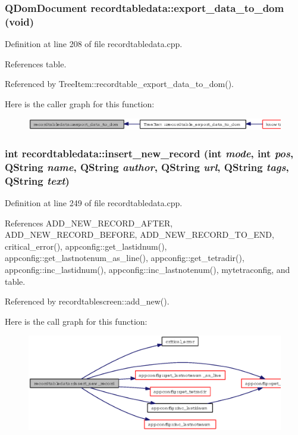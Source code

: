 \subsubsection{\setlength{\rightskip}{0pt plus 5cm}QDom\-Document recordtabledata::export\_\-data\_\-to\_\-dom (void)}\label{classrecordtabledata_fd04b0ca1500e0fd9ac3fb2d56c12b82}




Definition at line 208 of file recordtabledata.cpp.

References table.

Referenced by Tree\-Item::recordtable\_\-export\_\-data\_\-to\_\-dom().

Here is the caller graph for this function:\begin{figure}[H]
\begin{center}
\leavevmode
\includegraphics[width=371pt]{classrecordtabledata_fd04b0ca1500e0fd9ac3fb2d56c12b82_icgraph}
\end{center}
\end{figure}
\subsubsection{\setlength{\rightskip}{0pt plus 5cm}int recordtabledata::insert\_\-new\_\-record (int {\em mode}, int {\em pos}, QString {\em name}, QString {\em author}, QString {\em url}, QString {\em tags}, QString {\em text})}\label{classrecordtabledata_15f519acd76fc58f882e5a5d78105c61}




Definition at line 249 of file recordtabledata.cpp.

References ADD\_\-NEW\_\-RECORD\_\-AFTER, ADD\_\-NEW\_\-RECORD\_\-BEFORE, ADD\_\-NEW\_\-RECORD\_\-TO\_\-END, critical\_\-error(), appconfig::get\_\-lastidnum(), appconfig::get\_\-lastnotenum\_\-as\_\-line(), appconfig::get\_\-tetradir(), appconfig::inc\_\-lastidnum(), appconfig::inc\_\-lastnotenum(), mytetraconfig, and table.

Referenced by recordtablescreen::add\_\-new().

Here is the call graph for this function:\begin{figure}[H]
\begin{center}
\leavevmode
\includegraphics[width=329pt]{classrecordtabledata_15f519acd76fc58f882e5a5d78105c61_cgraph}
\end{center}
\end{figure}



